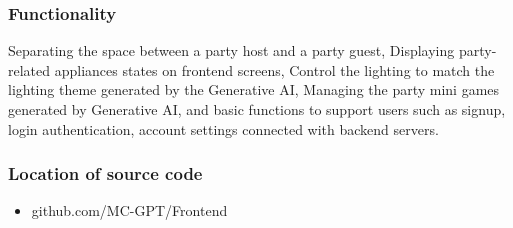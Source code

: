 \documentclass[conference]{IEEEtran}
\begin{document}
        \subsubsection{Functionality}
            Separating the space between a party host and a party guest, Displaying party-related appliances states on frontend screens, Control the lighting to match the lighting theme generated by the Generative AI, Managing the party mini games generated by Generative AI, and basic functions to support users such as signup, login authentication, account settings connected with backend servers.\\
            \vspace{3mm}
        \subsubsection{Location of source code}
            \begin{itemize}
                \item  github.com/MC-GPT/Frontend
            \end{itemize}
            
\end{document}
